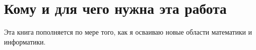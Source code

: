 \chapter{Кому и для чего нужна эта работа}

Эта книга пополняется по мере того, как я осваиваю новые области математики и информатики.
